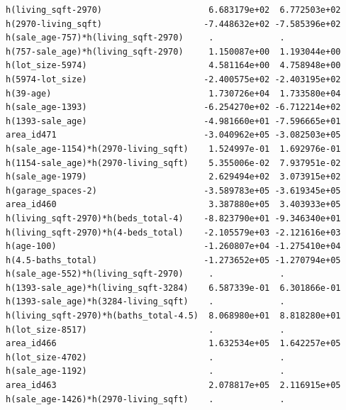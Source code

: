 \documentclass[
]{article}
\begin{document}
\begin{verbatim}
h(living_sqft-2970)                     6.683179e+02  6.772503e+02
h(2970-living_sqft)                    -7.448632e+02 -7.585396e+02
h(sale_age-757)*h(living_sqft-2970)     .             .           
h(757-sale_age)*h(living_sqft-2970)     1.150087e+00  1.193044e+00
h(lot_size-5974)                        4.581164e+00  4.758948e+00
h(5974-lot_size)                       -2.400575e+02 -2.403195e+02
h(39-age)                               1.730726e+04  1.733580e+04
h(sale_age-1393)                       -6.254270e+02 -6.712214e+02
h(1393-sale_age)                       -4.981660e+01 -7.596665e+01
area_id471                             -3.040962e+05 -3.082503e+05
h(sale_age-1154)*h(2970-living_sqft)    1.524997e-01  1.692976e-01
h(1154-sale_age)*h(2970-living_sqft)    5.355006e-02  7.937951e-02
h(sale_age-1979)                        2.629494e+02  3.073915e+02
h(garage_spaces-2)                     -3.589783e+05 -3.619345e+05
area_id460                              3.387880e+05  3.403933e+05
h(living_sqft-2970)*h(beds_total-4)    -8.823790e+01 -9.346340e+01
h(living_sqft-2970)*h(4-beds_total)    -2.105579e+03 -2.121616e+03
h(age-100)                             -1.260807e+04 -1.275410e+04
h(4.5-baths_total)                     -1.273652e+05 -1.270794e+05
h(sale_age-552)*h(living_sqft-2970)     .             .           
h(1393-sale_age)*h(living_sqft-3284)    6.587339e-01  6.301866e-01
h(1393-sale_age)*h(3284-living_sqft)    .             .           
h(living_sqft-2970)*h(baths_total-4.5)  8.068980e+01  8.818280e+01
h(lot_size-8517)                        .             .           
area_id466                              1.632534e+05  1.642257e+05
h(lot_size-4702)                        .             .           
h(sale_age-1192)                        .             .           
area_id463                              2.078817e+05  2.116915e+05
h(sale_age-1426)*h(2970-living_sqft)    .             .           
                                                                  

\end{verbatim}
\end{document}

